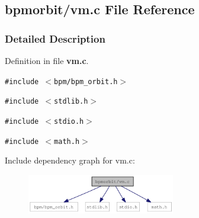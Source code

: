 \subsection{bpmorbit/vm.c File Reference}
\label{vm_8c}


\subsubsection{Detailed Description}


Definition in file {\bf vm.c}.

{\tt \#include $<$bpm/bpm\_\-orbit.h$>$}\par
{\tt \#include $<$stdlib.h$>$}\par
{\tt \#include $<$stdio.h$>$}\par
{\tt \#include $<$math.h$>$}\par


Include dependency graph for vm.c:\nopagebreak
\begin{figure}[H]
\begin{center}
\leavevmode
\includegraphics[width=183pt]{vm_8c__incl}
\end{center}
\end{figure}
